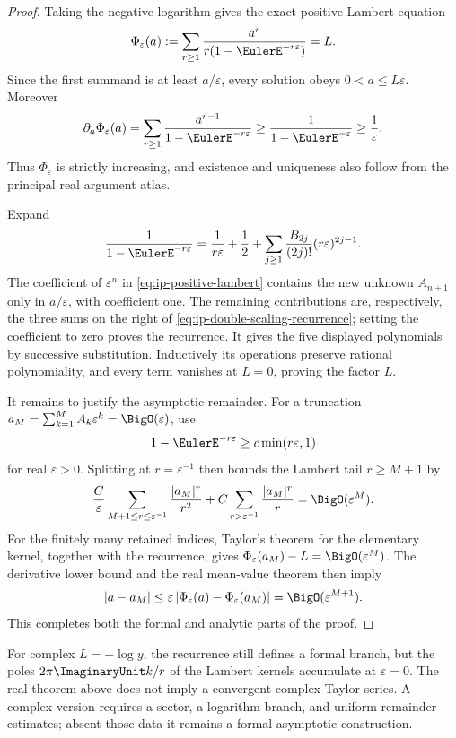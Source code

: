 \begin{proof}
Taking the negative logarithm gives the exact positive Lambert equation
\begin{equation}
 \Phi_\varepsilon(a):=
 \sum_{r\geq1}\frac{a^r}{r(1-\EulerE^{-r\varepsilon})}=L.
 \label{eq:ip-positive-lambert}
\end{equation}
Since the first summand is at least \(a/\varepsilon\), every solution obeys
\(0<a\leq L\varepsilon\).  Moreover
\[
 \partial_a\Phi_\varepsilon(a)
 =\sum_{r\geq1}\frac{a^{r-1}}{1-\EulerE^{-r\varepsilon}}
 \geq\frac1{1-\EulerE^{-\varepsilon}}\geq\frac1\varepsilon.
\]
Thus \(\Phi_\varepsilon\) is strictly increasing, and existence and uniqueness
also follow from the principal real argument atlas.

Expand
\[
 \frac1{1-\EulerE^{-r\varepsilon}}
 =\frac1{r\varepsilon}+\frac12+
 \sum_{j\geq1}\frac{B_{2j}}{(2j)!}
 (r\varepsilon)^{2j-1}.
\]
The coefficient of \(\varepsilon^n\) in
\cref{eq:ip-positive-lambert} contains the new unknown \(A_{n+1}\) only in
\(a/\varepsilon\), with coefficient one.  The remaining contributions are,
respectively, the three sums on the right of
\cref{eq:ip-double-scaling-recurrence}; setting the coefficient to zero proves
the recurrence.  It gives the five displayed polynomials by successive
substitution.  Inductively its operations preserve rational polynomiality,
and every term vanishes at \(L=0\), proving the factor \(L\).

It remains to justify the asymptotic remainder.  For a truncation
\(a_M=\sum_{k=1}^{M}A_k\varepsilon^k=\BigO(\varepsilon)\), use
\[
 1-\EulerE^{-r\varepsilon}\geq c\min(r\varepsilon,1)
\]
for real \(\varepsilon>0\).  Splitting at \(r=\varepsilon^{-1}\) then bounds
the Lambert tail \(r\geq M+1\) by
\[
 \frac C\varepsilon
 \sum_{M+1\leq r\leq\varepsilon^{-1}}\frac{|a_M|^r}{r^2}
 +C\sum_{r>\varepsilon^{-1}}\frac{|a_M|^r}{r}
 =\BigO(\varepsilon^M).
\]
For the finitely many retained indices, Taylor's theorem for the elementary
kernel, together with the recurrence, gives
\(\Phi_\varepsilon(a_M)-L=\BigO(\varepsilon^M)\).  The derivative lower bound
and the real mean-value theorem then imply
\[
 |a-a_M|\leq\varepsilon\,|\Phi_\varepsilon(a)-\Phi_\varepsilon(a_M)|
 =\BigO(\varepsilon^{M+1}).
\]
This completes both the formal and analytic parts of the proof.
\end{proof}

\begin{warning}
For complex \(L=-\log y\), the recurrence still defines a formal branch, but
the poles \(2\pi\ImaginaryUnit k/r\) of the Lambert kernels accumulate at
\(\varepsilon=0\).  The real theorem above does not imply a convergent complex
Taylor series.  A complex version requires a sector, a logarithm branch, and
uniform remainder estimates; absent those data it remains a formal
asymptotic construction.
\end{warning}

